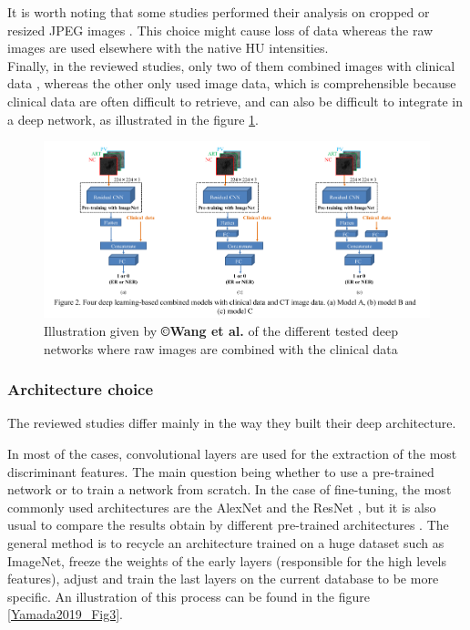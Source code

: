 It is worth noting that some studies performed their analysis on cropped or
resized JPEG images \cite{Yasaka2018,Yasaka2018a,WANG2019}. 
This choice might cause loss of data whereas the raw images are used elsewhere with the native HU intensities.\\
Finally, in the reviewed studies, only two of them combined images with
clinical data \cite{Yasaka2018a,WANG2019}, whereas the other only used image data, which is
comprehensible because clinical data are often difficult to retrieve,
and can also be difficult to integrate in a deep network, as illustrated
in the figure \ref{Wang2019_Fig2}.
\begin{figure}[th!]
\centering
\includegraphics[width=0.7\linewidth]{images/image5}
\caption{Illustration given by \textbf{©Wang et al.} of the different tested deep networks where raw images are combined with the clinical data \cite{WANG2019}}
\label{Wang2019_Fig2}
\end{figure}


\subsubsection{Architecture choice}\label{architecure-choice}



The reviewed studies differ mainly in the way they built their deep
architecture.

In most of the cases, convolutional layers are used for the extraction
of the most discriminant features. The main question being whether to
use a pre-trained network or to train a network from scratch. In the
case of fine-tuning, the most commonly used architectures are the
AlexNet and the ResNet \cite{WANG2019,Wang2018,Yamada2019,Peng2020}, but it is also usual to
compare the results obtain by different pre-trained architectures \cite{WANG2019,Yamada2019}. The general method
is to recycle an architecture trained on a huge dataset such as
ImageNet, freeze the weights of the early layers (responsible for the
high levels features), adjust and train the last layers on the current
database to be more specific.
An illustration of this process can be found in the figure \ref{Yamada2019_Fig3}.

